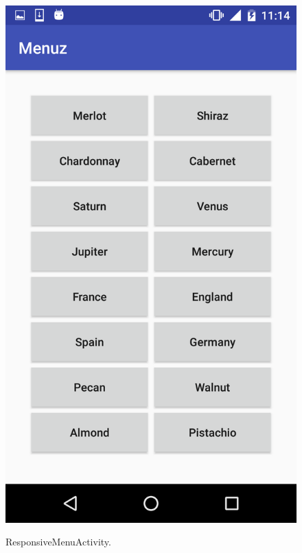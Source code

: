 \begin{figure}[!ht]
  \begin{center}
    \includegraphics[scale=0.22]{img/resp_menu.png}
    \label{fig:resp_menu}
    \caption{ResponsiveMenuActivity.}
  \end{center}
\end{figure}

\newpage

